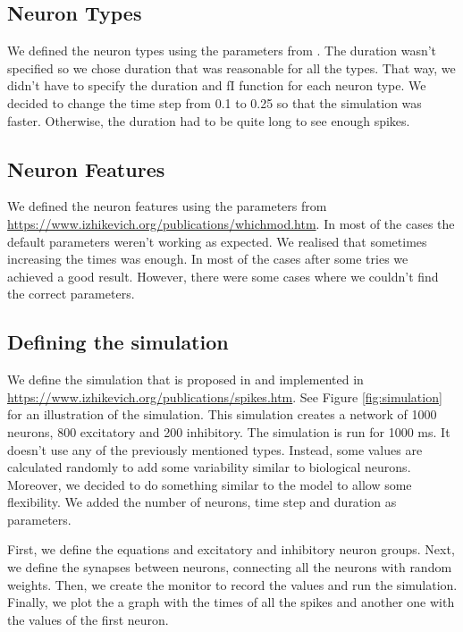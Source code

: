 \documentclass{article} %
\begin{document}
\subsection{Neuron Types}
We defined the neuron types using the parameters from \cite{Izhikevich2003Simple}. The duration wasn't specified so we chose duration that was reasonable for all the types. That way, we didn't have to specify the duration and fI function for each neuron type. We decided to change the time step from 0.1 to 0.25 so that the simulation was faster. Otherwise, the duration had to be quite long to see enough spikes.

\subsection{Neuron Features}
We defined the neuron features using the parameters from \url{https://www.izhikevich.org/publications/whichmod.htm}. In most of the cases the default parameters weren't working as expected. We realised that sometimes increasing the times was enough. In most of the cases after some tries we achieved a good result. However, there were some cases where we couldn't find the correct parameters.

\subsection{Defining the simulation}
We define the simulation that is proposed in \cite{Izhikevich2003Simple} and implemented in \url{https://www.izhikevich.org/publications/spikes.htm}. See Figure \ref{fig:simulation} for an illustration of the simulation. This simulation creates a network of 1000 neurons, 800 excitatory and 200 inhibitory. The simulation is run for 1000 ms. It doesn't use any of the previously mentioned types. Instead, some values are calculated randomly to add some variability similar to biological neurons. Moreover, we decided to do something similar to the model to allow some flexibility. We added the number of neurons, time step and duration as parameters.

First, we define the equations and excitatory and inhibitory neuron groups. Next, we define the synapses between neurons, connecting all the neurons with random weights. Then, we create the monitor to record the values and run the simulation. Finally, we plot the a graph with the times of all the spikes and another one with the values of the first neuron.
\end{document}
